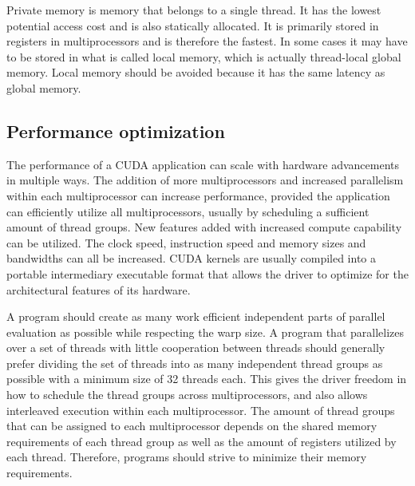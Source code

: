 Private memory is memory that belongs to a single thread. It has the lowest potential access cost and is also statically allocated. It is primarily stored in registers in multiprocessors and is therefore the fastest. In some cases it may have to be stored in what is called local memory, which is actually thread-local global memory. Local memory should be avoided because it has the same latency as global memory.


\subsection{Performance optimization}

The performance of a CUDA application can scale with hardware advancements in multiple ways. The addition of more multiprocessors and increased parallelism within each multiprocessor can increase performance, provided the application can efficiently utilize all multiprocessors, usually by scheduling a sufficient amount of thread groups. New features added with increased compute capability can be utilized. The clock speed, instruction speed and memory sizes and bandwidths can all be increased. CUDA kernels are usually compiled into a portable intermediary executable format that allows the driver to optimize for the architectural features of its hardware.

A program should create as many work efficient independent parts of parallel evaluation as possible while respecting the warp size. A program that parallelizes over a set of threads with little cooperation between threads should generally prefer dividing the set of threads into as many independent thread groups as possible with a minimum size of 32 threads each. This gives the driver freedom in how to schedule the thread groups across multiprocessors, and also allows interleaved execution within each multiprocessor. The amount of thread groups that can be assigned to each multiprocessor depends on the shared memory requirements of each thread group as well as the amount of registers utilized by each thread. Therefore, programs should strive to minimize their memory requirements.


